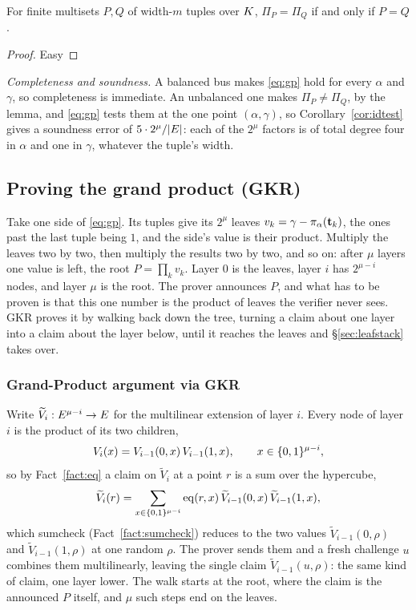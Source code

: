 \begin{lemma}\label{lem:gp}
For finite multisets $P,Q$ of width-$m$ tuples over $K$, $\Pi_P=\Pi_Q$ if and only if $P=Q$.
\end{lemma}

\begin{proof}
Easy
\end{proof}

\emph{Completeness and soundness.} A balanced bus makes \eqref{eq:gp} hold for every $\alpha$ and $\gamma$, so completeness is immediate. An unbalanced one makes $\Pi_P\neq\Pi_Q$, by the lemma, and \eqref{eq:gp} tests them at the one point $(\alpha,\gamma)$, so Corollary~\ref{cor:idtest} gives a soundness error of $5\cdot 2^{\mu}/|E|$: each of the $2^{\mu}$ factors is of total degree four in $\alpha$ and one in $\gamma$, whatever the tuple's width.

\subsection{Proving the grand product (GKR)}\label{sec:gkr}

Take one side of \eqref{eq:gp}. Its tuples give its $2^{\mu}$ leaves $v_k=\gamma-\pi_\alpha(\mathbf{t}_k)$, the ones past the last tuple being $1$, and the side's value is their product. Multiply the leaves two by two, then multiply the results two by two, and so on: after $\mu$ layers one value is left, the root $P=\prod_kv_k$. Layer $0$ is the leaves, layer $i$ has $2^{\mu-i}$ nodes, and layer $\mu$ is the root. The prover announces $P$, and what has to be proven is that this one number is the product of leaves the verifier never sees. GKR proves it by walking back down the tree, turning a claim about one layer into a claim about the layer below, until it reaches the leaves and \S\ref{sec:leafstack} takes over.

\subsubsection{Grand-Product argument via GKR}

Write $\widetilde V_i:E^{\mu-i}\to E$ for the multilinear extension of layer $i$. Every node of layer $i$ is the product of its two children,
\[
V_i(x)=V_{i-1}(0,x)\,V_{i-1}(1,x),\qquad x\in\{0,1\}^{\mu-i},
\]
so by Fact~\ref{fact:eq} a claim on $\widetilde V_i$ at a point $r$ is a sum over the hypercube,
\[
\widetilde V_i(r)=\sum_{x\in\{0,1\}^{\mu-i}}\operatorname{eq}(r,x)\,\widetilde V_{i-1}(0,x)\,\widetilde V_{i-1}(1,x),
\]
which sumcheck (Fact~\ref{fact:sumcheck}) reduces to the two values $\widetilde V_{i-1}(0,\rho)$ and $\widetilde V_{i-1}(1,\rho)$ at one random $\rho$. The prover sends them and a fresh challenge $u$ combines them multilinearly, leaving the single claim $\widetilde V_{i-1}(u,\rho)$: the same kind of claim, one layer lower. The walk starts at the root, where the claim is the announced $P$ itself, and $\mu$ such steps end on the leaves.

